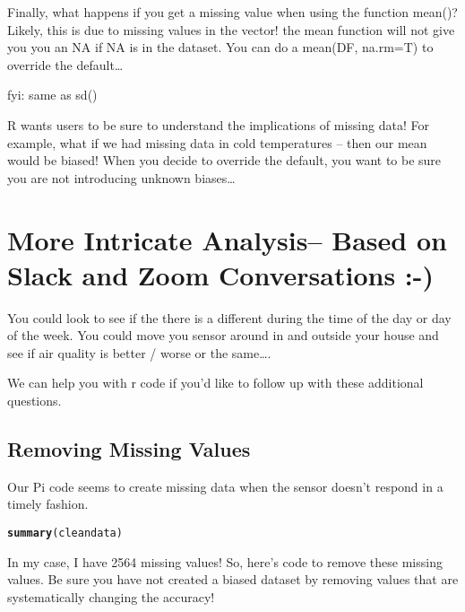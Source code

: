 \documentclass{article}\usepackage[]{graphicx}\usepackage[]{xcolor}
\makeatletter
\newcommand{\hlstd}[1]{\textcolor[rgb]{0.345,0.345,0.345}{#1}}%
\newcommand{\hlkwd}[1]{\textcolor[rgb]{0.737,0.353,0.396}{\textbf{#1}}}%
\newenvironment{kframe}{%
 \def\at@end@of@kframe{}%
 \ifinner\ifhmode%
  \def\at@end@of@kframe{\end{minipage}}%
  \begin{minipage}{\columnwidth}%
 \fi\fi%
 \def\FrameCommand##1{\hskip\@totalleftmargin \hskip-\fboxsep
 \colorbox{shadecolor}{##1}\hskip-\fboxsep
     \hskip-\linewidth \hskip-\@totalleftmargin \hskip\columnwidth}%
 \MakeFramed {\advance\hsize-\width
   \@totalleftmargin\z@ \linewidth\hsize
   \@setminipage}}%
 {\par\unskip\endMakeFramed%
 \at@end@of@kframe}
\newenvironment{knitrout}{}{} %
\makeatother
\begin{document}
Finally, what happens if you get a missing value when using the function mean()?  Likely, this is due to missing values in the vector!  the mean function will not give you you an NA if NA is in the dataset. You can do a mean(DF, na.rm=T) to override the default\ldots

fyi: same as sd()

R wants users to be sure to understand the implications of missing data!  For example, what if we had missing data in cold temperatures -- then our mean would be biased!  When you decide to override the default, you want to be sure you are not introducing unknown biases\ldots

\section{More Intricate Analysis-- Based on Slack and Zoom Conversations :-)}

You could look to see if the there is a different during the time of the day or day of the week. You could move you sensor around in and outside your house and see if air quality is better / worse or the same\ldots.

We can help you with r code if you'd like to follow up with these additional questions. 

\subsection{Removing Missing Values}

Our Pi code seems to create missing data when the sensor doesn't respond in a timely fashion. 
\begin{knitrout}
\color{fgcolor}\begin{kframe}
\begin{alltt}
\hlkwd{summary}\hlstd{(cleandata)}
\end{alltt}


{\ttfamily\noindent\bfseries\color{errorcolor}{\#\# Error in summary(cleandata): object 'cleandata' not found}}\end{kframe}
\end{knitrout}
In my case, I have 2564 missing values! So, here's code to remove these missing values. Be sure you have not created a biased dataset by removing values that are systematically changing the accuracy!
\end{document}
